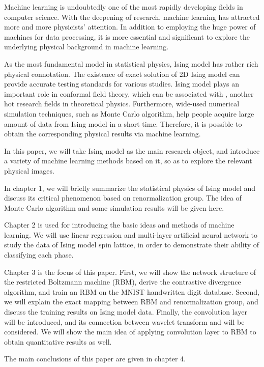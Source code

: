Machine learning is undoubtedly one of the most rapidly developing fields in computer science.
With the deepening of research, machine learning has attracted more and more physicists' attention.
In addition to employing the huge power of machines for data processing, it is more essential and
significant to explore the underlying physical background in machine learning.

As the most fundamental model in statistical physics, Ising model has rather rich physical
connotation. The existence of exact solution of 2D Ising model can provide accurate testing
standards for various studies. Ising model plays an important role in conformal field theory,
which can be associated with \AdSCFT{}, another hot research fields in theoretical physics.
Furthermore, wide-used numerical simulation techniques, such as Monte Carlo algorithm, help people
acquire large amount of data from Ising model in a short time. Therefore, it is possible to obtain
the corresponding physical results via machine learning.

In this paper, we will take Ising model as the main research object, and introduce a variety of
machine learning methods based on it, so as to explore the relevant physical images.

In chapter 1, we will briefly summarize the statistical physics of Ising model and discuss its
critical phenomenon based on renormalization group. The idea of Monte Carlo algorithm and some
simulation results will be given here.

Chapter 2 is used for introducing the basic ideas and methods of machine learning. We will use
linear regression and multi-layer artificial neural network to study the data of Ising model spin
lattice, in order to demonstrate their ability of classifying each phase.

Chapter 3 is the focus of this paper. First, we will show the network structure of the restricted
Boltzmann machine (RBM), derive the contrastive divergence algorithm, and train an RBM on the MNIST
handwritten digit database. Second, we will explain the exact mapping between RBM and
renormalization group, and discuss the training results on Ising model data. Finally, the
convolution layer will be introduced, and its connection between wavelet transform and \AdSCFT{}
will be considered. We will show the main idea of applying convolution layer to RBM to obtain
quantitative results as well.

The main conclusions of this paper are given in chapter 4.
